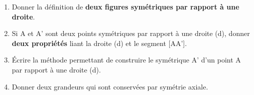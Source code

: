 \documentclass[exercice]{thedocument}%
\begin{document}
%
\begin{enumerate}
    \item Donner la définition de \textbf{deux figures symétriques par
    rapport à une droite}.
    \dotedline\dotedline\dotedline\dotedline
    \item Si A et A' sont deux points symétriques par rapport à une droite
    (d), donner \textbf{deux propriétés} liant la droite (d) et le segment [AA'].
    \dotedline\dotedline\dotedline\dotedline
    \item Écrire la méthode permettant de construire le symétrique A' d'un
    point A par rapport à une droite (d).
    \dotedline\dotedline\dotedline\dotedline
    \item Donner deux grandeurs qui sont conservées par symétrie axiale.
    \dotedline\dotedline\dotedline\dotedline
\end{enumerate}
\end{document}
